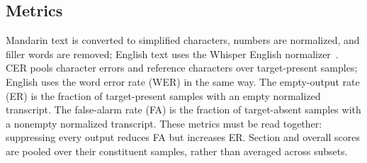\subsection{Metrics}
Mandarin text is converted to simplified characters, numbers are normalized, and filler words are removed; English text uses the Whisper English normalizer~\cite{radford2023robust}.
CER pools character errors and reference characters over target-present samples; English uses the word error rate (WER) in the same way.
The empty-output rate (ER) is the fraction of target-present samples with an empty normalized transcript.
The false-alarm rate (FA) is the fraction of target-absent samples with a nonempty normalized transcript.
These metrics must be read together: suppressing every output reduces FA but increases ER.
Section and overall scores are pooled over their constituent samples, rather than averaged across subsets.
